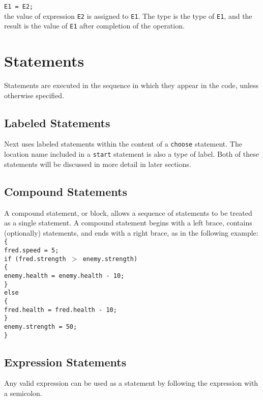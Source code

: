 \documentclass[12pt]{article}
\begin{document}
\texttt{E1 = E2;} \\

\noindent the value of expression \texttt{E2} is assigned to \texttt{E1}.  The type is the type of \texttt{E1}, and the result is the value of \texttt{E1} after completion of the operation.

\section{Statements}
Statements are executed in the sequence in which they appear in the code, unless otherwise specified.

\subsection{Labeled Statements}
Next uses labeled statements within the content of a \texttt{choose} statement.  The location name included in a \texttt{start} statement is also a type of label.  Both of these statements will be discussed in more detail in later sections.

\subsection{Compound Statements}
A compound statement, or block, allows a sequence of statements to be treated as a single statement.  A compound statement begins with a left brace, contains (optionally) statements, and ends with a right brace, as in the following example: \\

\noindent \texttt{\{ \\
\indent fred.speed = 5; \\
\indent if (fred.strength $>$ enemy.strength) \\
\indent \{ \\
\indent \indent enemy.health = enemy.health - 10;  \\
\indent \} \\
\indent else \\
\indent \{ \\
\indent \indent fred.health = fred.health - 10; \\
\indent \} \\
\indent enemy.strength = 50; \\
\} }

\subsection{Expression Statements}
Any valid expression can be used as a statement by following the expression with a semicolon.
\end{document}
